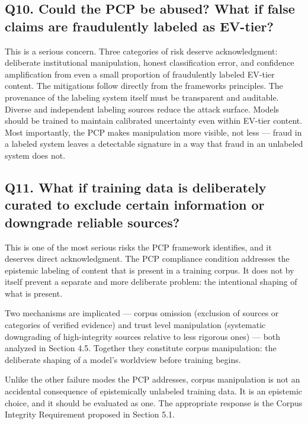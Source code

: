 \documentclass[
]{article}
\begin{document}
\subsection{Q10. Could the PCP be abused? What if false claims are
fraudulently labeled as
EV-tier?}\label{q10.-could-the-pcp-be-abused-what-if-false-claims-are-fraudulently-labeled-as-ev-tier}

This is a serious concern. Three categories of risk deserve
acknowledgment: deliberate institutional manipulation, honest
classification error, and confidence amplification from even a small
proportion of fraudulently labeled EV-tier content. The mitigations
follow directly from the framework\textquotesingle s principles. The
provenance of the labeling system itself must be transparent and
auditable. Diverse and independent labeling sources reduce the attack
surface. Models should be trained to maintain calibrated uncertainty
even within EV-tier content. Most importantly, the PCP makes
manipulation more visible, not less --- fraud in a labeled system leaves
a detectable signature in a way that fraud in an unlabeled system does
not.

\subsection{Q11. What if training data is deliberately curated to
exclude certain information or downgrade reliable
sources?}\label{q11.-what-if-training-data-is-deliberately-curated-to-exclude-certain-information-or-downgrade-reliable-sources}

This is one of the most serious risks the PCP framework identifies, and
it deserves direct acknowledgment. The PCP compliance condition
addresses the epistemic labeling of content that is present in a
training corpus. It does not by itself prevent a separate and more
deliberate problem: the intentional shaping of what is present.

Two mechanisms are implicated --- corpus omission (exclusion of sources
or categories of verified evidence) and trust level manipulation
(systematic downgrading of high-integrity sources relative to less
rigorous ones) --- both analyzed in Section 4.5. Together they
constitute corpus manipulation: the deliberate shaping of a model's
worldview before training begins.

Unlike the other failure modes the PCP addresses, corpus manipulation is
not an accidental consequence of epistemically unlabeled training data.
It is an epistemic choice, and it should be evaluated as one. The
appropriate response is the Corpus Integrity Requirement proposed in
Section 5.1.
\end{document}
